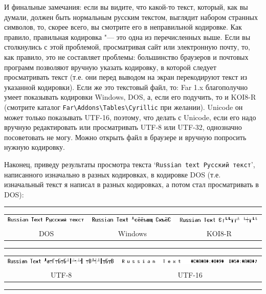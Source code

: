 И финальные замечания: если вы видите, что какой-то текст, который, как вы думали, должен быть 
нормальным русским текстом, выглядит набором странных символов, то, скорее всего, вы смотрите его в 
неправильной кодировке. Как правило, правильная кодировка "--- это одна из перечисленных выше. Если 
вы столкнулись с этой проблемой, просматривая сайт или электронную почту, то, как правило, это не 
составляет проблемы: большинство браузеров и почтовых программ позволяют вручную указать кодировку, 
в которой следует просматривать текст (т.е. они перед выводом на экран перекодируют текст из 
указанной кодировки). Если же это текстовый файл, то: Far 1.x благополучно умеет показывать кодировки 
Windows, DOS, а, если его подучить, то и KOI8-R (смотрите каталог \verb|Far\Addons\Tables\Cyrillic| при
желании). Unicode он может только показывать UTF-16, поэтому, что делать с Unicode, если его надо 
вручную редактировать или просматривать UTF-8 или UTF-32, однозначно посоветовать не могу. Можно 
открыть файл в браузере и вручную попросить нужную кодировку.

Наконец, приведу результаты просмотра текста `\texttt{Russian text Русский текст}', написанного 
изначально в разных кодировках, в кодировке DOS (т.е. изначальный текст я написал в разных 
кодировках, а потом стал просматривать в DOS):

\begin{center}
\hrule

\vspace{0.2cm}
\noindent\begin{tabular}{c|c|c}
\includegraphics[width=5cm,height=0.4cm]{ideas/03_1_encodings/rustext_dos.bmp}&
\includegraphics[width=5cm,height=0.4cm]{ideas/03_1_encodings/rustext_win.bmp}&
\includegraphics[width=5cm,height=0.4cm]{ideas/03_1_encodings/rustext_koi.bmp}\\
DOS&Windows&KOI8-R
\end{tabular}

\vspace{0.2cm}
\hrule
\vspace{0.2cm}

\noindent\begin{tabular}{c|c}
\includegraphics[width=7cm,height=0.4cm]{ideas/03_1_encodings/rustext_utf8.bmp}&
\includegraphics[width=9cm,height=0.4cm]{ideas/03_1_encodings/rustext_utf16.bmp}\\
UTF-8&UTF-16
\end{tabular}
\vspace{0.2cm}
\hrule
\end{center}

